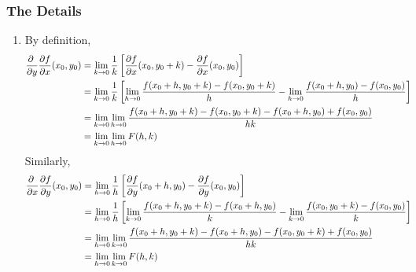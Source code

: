 \subsubsection{The Details} 
\begin{enumerate}[(1)]
\item
By definition,
\begin{align*}
\pdiff{}{y}
\pdiff{f}{x}(x_0,y_0)
&=\lim_{k\rightarrow 0}\frac{1}{k}
\left[\pdiff{f}{x}(x_0,y_0+k)
-\pdiff{f}{x}(x_0,y_0)\right]\cr
&=\lim_{k\rightarrow 0}\frac{1}{k}
\left[\lim_{h\rightarrow 0}\frac{f(x_0+h,y_0+k)-f(x_0,y_0+k)}{h}
-\lim_{h\rightarrow 0}\frac{f(x_0+h,y_0)-f(x_0,y_0)}{h}\right]\cr
&=\lim_{k\rightarrow 0}\lim_{h\rightarrow 0}
\frac{f(x_0+h,y_0+k)-f(x_0,y_0+k)-f(x_0+h,y_0)+f(x_0,y_0)}{hk}\cr
&= \lim_{k\rightarrow 0}\lim_{h\rightarrow 0}F(h,k)
\end{align*}
Similarly,
\begin{align*}
\pdiff{}{x}
\pdiff{f}{y}(x_0,y_0)
&=\lim_{h\rightarrow 0}\frac{1}{h}
\left[\pdiff{f}{y}(x_0+h,y_0)
-\pdiff{f}{y}(x_0,y_0)\right]\cr
&=\lim_{h\rightarrow 0}\frac{1}{h}
\left[\lim_{k\rightarrow 0}\frac{f(x_0+h,y_0+k)-f(x_0+h,y_0)}{k}
-\lim_{k\rightarrow 0}\frac{f(x_0,y_0+k)-f(x_0,y_0)}{k}\right]\cr
&=\lim_{h\rightarrow 0}\lim_{k\rightarrow 0}
\frac{f(x_0+h,y_0+k)-f(x_0+h,y_0)-f(x_0,y_0+k)+f(x_0,y_0)}{hk}\cr
&= \lim_{h\rightarrow 0}\lim_{k\rightarrow 0}F(h,k)
\end{align*}


\end{enumerate}
